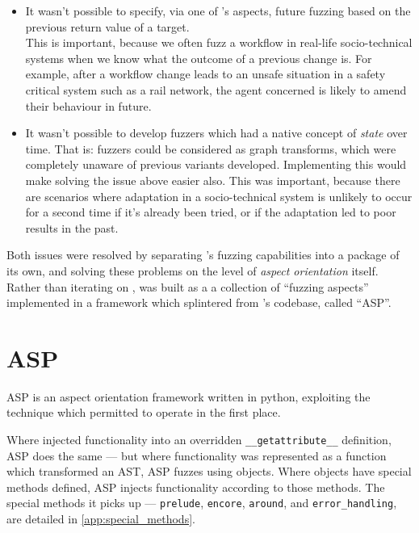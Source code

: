 \documentclass[draft]{article}
\begin{document}
\begin{itemize}
\item It wasn't possible to specify, via one of \pdsf{}'s aspects, future
  fuzzing based on the previous return value of a target.\\
  This is important, because we often fuzz a workflow in real-life
  socio-technical systems when we know what the outcome of a previous change is.
  For example, after a workflow change leads to an unsafe situation in a safety
  critical system such as a rail network, the agent concerned is likely to amend
  their behaviour in future.
\item It wasn't possible to develop fuzzers which had a native concept of
  \emph{state} over time. That is: fuzzers could be considered as graph
  transforms, which were completely unaware of previous variants developed.
  Implementing this would make solving the issue above easier also. This was
  important, because there are scenarios where adaptation in a socio-technical
  system is unlikely to occur for a second time if it's already been tried, or
  if the adaptation led to poor results in the past.
\end{itemize}

Both issues were resolved by separating \pdsf{}'s fuzzing capabilities into a
package of its own, and solving these problems on the level of \emph{aspect
  orientation} itself. Rather than iterating on \pdsf{}, \pdsf{} was built as
a a collection of ``fuzzing aspects'' implemented in a framework which
splintered from \pdsf{}'s codebase, called ``ASP''.\par


\section{ASP}
ASP\cite{asp_repo} is an aspect orientation framework written in python,
exploiting the technique which permitted \pdsf{} to operate in the first
place.\par

Where \pdsf{} injected functionality into an overridden
\texttt{\_\_getattribute\_\_} definition, ASP does the same --- but where
functionality was represented as a function which transformed an AST, ASP fuzzes
using objects. Where objects have special methods defined, ASP injects
functionality according to those methods. The special methods it picks up ---
\texttt{prelude}, \texttt{encore}, \texttt{around}, and \texttt{error\_handling},
are detailed in \cref{app:special_methods}.
\end{document}
